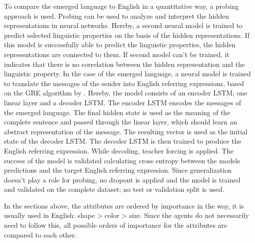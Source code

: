 To compare the emerged language to English in a quantitative way, a probing approach is used.
Probing can be used to analyze and interpret the hidden representations in neural networks.
Hereby, a second neural model is trained to predict selected linguistic properties on the basis of the hidden representations.
If this model is successfully able to predict the linguistic properties, the hidden representations are connected to them.
If second model can't be trained, it indicates that there is no correlation between the hidden representation and the linguistic property.
In the case of the emerged language, a neural model is trained to translate the messages of the sender into English referring expressions, based on the GRE algorithm by \cite{Dale1995}.
Hereby, the model consists of an encoder LSTM, one linear layer and a decoder LSTM.
The encoder LSTM encodes the messages of the emerged language.
The final hidden state is used as the meaning of the complete sentence and passed through the linear layer, which should learn an abstract representation of the message.
The resulting vector is used as the initial state of the decoder LSTM.
The decoder LSTM is then trained to produce the English referring expression.
While decoding, teacher forcing is applied.
The success of the model is validated calculating cross entropy between the models predictions and the target English referring expression.
Since generalization doesn't play a role for probing, no dropout is applied and the model is trained and validated on the complete dataset; no test or validation split is used.

In the sections above, the attributes are ordered by importance in the way, it is usually used in English: shape > color > size.
Since the agents do not necessarily need to follow this, all possible orders of importance for the attributes are compared to each other.

